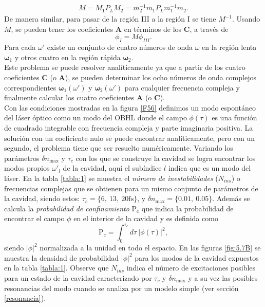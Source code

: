 \begin{align}\label{matrizM}
M=M_1P_LM_2=m_2^{-1}m_1P_Lm_1^{-1}m_2.
\end{align}
De manera similar, para pasar de la regi\'{o}n III a la regi\'{o}n I se tiene $M^{-1}$. Usando $M$, se pueden tener los coeficientes $\textbf{A}$ en t\'{e}rminos de los $\textbf{C}$, a trav\'{e}s de
\begin{equation}
\phi_I=M\phi_{III}.
\end{equation} 
Para cada $\omega'$ existe un conjunto de cuatro n\'{u}meros de onda $\omega$ en la regi\'{o}n lenta $\bm{\omega}_1$ y otros cuatro en la regi\'{o}n r\'{a}pida $\bm{\omega}_2$.\\

Este problema se puede resolver analíticamente ya que a partir de los cuatro coeficientes $\textbf{C}$ (o $\textbf{A}$), se pueden determinar los ocho números de onda complejos correspondientes
$\bm{\omega}_1(\omega')$ y $\bm{\omega}_2(\omega')$ para cualquier frecuencia compleja y finalmente calcular los cuatro coeficientes\textbf{ A} (o \textbf{C}).\\

Con las condiciones mostradas en la figura \ref{F56} definimos un modo espontáneo del láser \'{o}ptico como un modo del OBHL donde el campo $\phi(\tau)$ es una funci\'{o}n de cuadrado integrable con frecuencia compleja y parte imaginaria positiva. La solución con un coeficiente nulo se puede encontrar analíticamente, pero con un segundo, el problema tiene que ser resuelto numéricamente. Variando los par\'{a}metros $\delta n_{\text{max}}$ y $\tau_c$ con los que se construye la cavidad se logra encontrar los modos propios $\omega'_l$ de la cavidad, aqu\'{i} el subíndice $l$ indica que es un modo del láser. En la tabla \ref{tabla:1} se muestra el \textit{n\'{u}mero de inestabilidades} ($N_{ins}$) o frecuencias complejas que se obtienen para un mismo conjunto de par\'{a}metros de la cavidad, siendo estos: $\tau_c=\{6,\ 13,\ 20\text{fs}\}$, y $\delta n_{\text{max}}=\{0.01, \ 0.05\}$. Adem\'{a}s se calcula la \textit{probabilidad de confinamiento} $\text{P}_{\text{c}}$ que indica la probabilidad de encontrar el campo $\phi$ en el interior de la cavidad y es definida como
\begin{equation}
\text{P}_{\text{c}}=\int_0^{\tau_c} d\tau \ |\phi(\tau)|^2,
\end{equation}
siendo $|\phi|^2$ normalizada a la unidad en todo el espacio. En las figuras \ref{fig:5.7B} se muestra la densidad de probabilidad $|\phi|^2$ para los modos de la cavidad expuestos en la tabla \ref{tabla:1}. Observe que $N_{ins}$ indica el n\'umero de excitaciones posibles para un estado de la cavidad caracterizado por $\tau_c$ y $\delta n_{\text{max}}$ y a su vez las posibles resonancias del modo cuando se analiza por un modelo simple (ver secci\'{o}n \ref{resonancia}). \\

